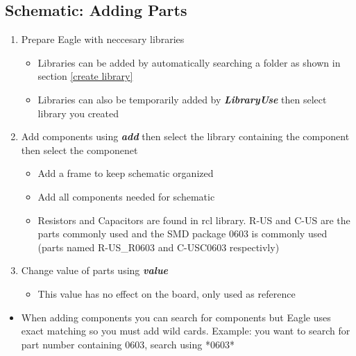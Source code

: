 \documentclass{article}
\begin{document}
\subsection{Schematic: Adding Parts}
\begin{enumerate}
    \item Prepare Eagle with neccesary libraries
    \begin{itemize}
        \item Libraries can be added by automatically searching a folder as
        shown in section \ref{create library}
        \item Libraries can also be temporarily added by
        \textit{\textbf{Library\textrightarrow Use}} then select library you
        created
    \end{itemize}
    \item Add components using \textit{\textbf{add}} then select the library
    containing the component then select the componenet
    \begin{itemize}
        \item Add a frame to keep schematic organized
        \item Add all components needed for schematic
        \item Resistors and Capacitors are found in rcl library. R-US and C-US
        are the parts commonly used and the SMD package 0603 is commonly used
        (parts named R-US\_R0603 and C-USC0603 respectivly)
    \end{itemize}
    \item Change value of parts using \textit{\textbf{value}}
    \begin{itemize}
        \item This value has no effect on the board, only used as reference
    \end{itemize}
\end{enumerate}
\begin{tcolorbox} [title=Tips \& Tricks]
    \begin{itemize}
        \item When adding components you can search for components but Eagle
        uses exact matching so you must add wild cards. Example: you want to
        search for part number containing 0603, search using *0603*
    \end{itemize}
\end{tcolorbox}
\end{document}
